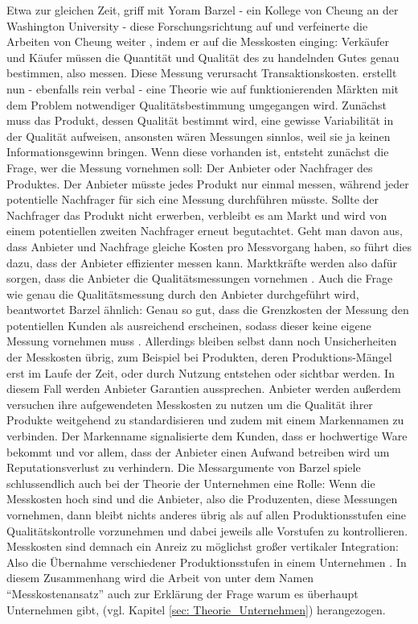 Etwa zur gleichen Zeit, griff mit Yoram Barzel - ein Kollege von Cheung an der Washington University - diese Forschungsrichtung auf und verfeinerte die Arbeiten von Cheung weiter \parencite[S. 33]{North1990}, indem er auf die Messkosten einging: Verkäufer und Käufer müssen die Quantität und Qualität des zu handelnden Gutes genau bestimmen, also messen. Diese Messung verursacht Transaktionskosten. \textcite{Barzel1982} erstellt nun - ebenfalls rein verbal - eine Theorie wie auf funktionierenden Märkten mit dem Problem notwendiger Qualitätsbestimmung umgegangen wird. Zunächst muss das Produkt, dessen Qualität bestimmt wird, eine gewisse Variabilität in der Qualität aufweisen, ansonsten wären Messungen sinnlos, weil sie ja keinen Informationsgewinn bringen. Wenn diese vorhanden ist, entsteht zunächst die Frage, wer die Messung vornehmen soll: Der Anbieter oder Nachfrager des Produktes. Der Anbieter müsste jedes Produkt nur einmal messen, während jeder potentielle Nachfrager für sich eine Messung durchführen müsste. Sollte der Nachfrager das Produkt nicht erwerben, verbleibt es am Markt und wird von einem potentiellen zweiten Nachfrager erneut begutachtet. Geht man davon aus, dass Anbieter und Nachfrage gleiche Kosten pro Messvorgang haben, so führt dies dazu, dass der Anbieter effizienter messen kann. Marktkräfte werden also dafür sorgen, dass die Anbieter die Qualitätsmessungen vornehmen \parencite[S. 30]{Barzel1982}. Auch die Frage wie genau die Qualitätsmessung durch den Anbieter durchgeführt wird, beantwortet Barzel ähnlich: Genau so gut, dass die Grenzkosten der Messung den potentiellen Kunden als ausreichend erscheinen, sodass dieser keine eigene Messung vornehmen muss \parencite[S. 30]{Barzel1982}. Allerdings bleiben selbst dann noch Unsicherheiten der Messkosten übrig, zum Beispiel bei Produkten, deren Produktions-Mängel erst im Laufe der Zeit, oder durch Nutzung entstehen oder sichtbar werden. In diesem Fall werden Anbieter Garantien aussprechen. Anbieter werden außerdem versuchen ihre aufgewendeten Messkosten zu nutzen um die Qualität ihrer Produkte weitgehend zu standardisieren und zudem mit einem Markennamen zu verbinden. Der Markenname signalisierte dem Kunden, dass er hochwertige Ware bekommt und vor allem, dass der Anbieter einen Aufwand betreiben wird um Reputationsverlust zu verhindern. Die Messargumente von Barzel spiele schlussendlich auch bei der Theorie der Unternehmen eine Rolle: Wenn die Messkosten hoch sind und die Anbieter, also die Produzenten, diese Messungen vornehmen, dann bleibt nichts anderes übrig als auf allen Produktionsstufen eine Qualitätskontrolle vorzunehmen und dabei jeweils alle Vorstufen zu kontrollieren. Messkosten sind demnach ein Anreiz zu möglichst großer vertikaler Integration: Also die Übernahme verschiedener Produktionsstufen in einem Unternehmen \parencite[S. 42]{Barzel1982}. In diesem Zusammenhang wird die Arbeit von \textcite{Barzel1982} unter dem Namen "`Messkostenansatz"' auch zur Erklärung der Frage warum es überhaupt Unternehmen gibt, (vgl. Kapitel \ref{sec: Theorie_Unternehmen}) herangezogen. 

